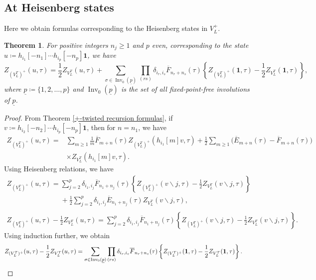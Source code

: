 \documentclass[pdftex]{sigma}
\numberwithin{equation}{section}
\newtheorem{Theorem}{Theorem}[section]
\theoremstyle{definition}
\begin{document}
\subsection{At Heisenberg states}

Here we obtain formulas corresponding to the Heisenberg states in $V_L^+$.

\begin{Theorem}\label{At Heisenberg states}
 For positive integers $n_j\geq 1$ and $p$ even, corresponding to the state
$u\coloneqq h_{i_1}[-n_1]\cdots h_{i_p}[-n_p]\mathbf{1}$,
 we have
 \[Z_{(V_L^T)^+}(u,\tau)=\frac{1}{2}Z_{V_L^T}(u,\tau)+\sum_{\sigma\in \operatorname{Inv}_0(\underline{p})}\prod_{(rs)}\delta_{i_r,i_s}\overline{F}_{n_r+n_s}(\tau)\left\{Z_{(V_L^T)^+}(\mathbf{1},\tau)-\frac{1}{2}Z_{V_L^T}(\mathbf{1},\tau)\right\},\]
 where $\underline{p}\coloneqq \{1,2,\dots, p\}$ and $\operatorname{Inv}_0(\underline{p})$ is the set of all fixed-point-free involutions of $\underline{p}$.
\end{Theorem}

\begin{proof}

From Theorem \ref{+-twisted recursion formulas}, if
$v\coloneqq h_{i_2}[-n_2]\cdots h_{i_p}[-n_p]\mathbf{1}$,
then for $n=n_1$, we have
\begin{align*}
Z_{(V_L^T)^+}(u,\tau)={}&\sum_{m\geq 1}\frac{1}{m}\overline{F}_{m+n}(\tau)Z_{(V_L^T)^+}(h_{i_1}[m]v,\tau)+\frac{1}{2}\sum_{m\geq 1}\bigl(\overline{E}_{m+n}(\tau)-\overline{F}_{m+n}(\tau)\bigr)\\
&\times Z_{V_L^T}(h_{i_1}[m]v, \tau).
\end{align*}
Using Heisenberg relations, we have
\begin{gather*}
Z_{(V_L^T)^+}(u,\tau)=\sum_{j=2}^p\delta_{i_1,i_j}\overline{F}_{n_1+n_j}(\tau)\left\{Z_{(V_L^T)^+}(v\backslash j,\tau)-\frac{1}{2}Z_{V_L^T}(v\backslash j,\tau)\right\}\\
\phantom{Z_{(V_L^T)^+}(u,\tau)=}{}+\frac{1}{2}\sum_{j=2}^p\delta_{i_1,i_j}\overline{E}_{n_1+n_j}(\tau)Z_{V_L^T}(v\backslash j,\tau),\\
Z_{(V_L^T)^+}(u,\tau)-\frac{1}{2}Z_{V_L^T}(u,\tau)=\sum_{j=2}^p\delta_{i_1,i_j}\overline{F}_{n_1+n_j}(\tau)\left\{Z_{(V_L^T)^+}(v\backslash j,\tau)-\frac{1}{2}Z_{V_L^T}(v\backslash j,\tau)\right\}.
\end{gather*}
Using induction further, we obtain
\[
Z_{(V_L^T)^+}(u,\tau)-\frac{1}{2}Z_{V_L^T}(u,\tau)=\sum_{\sigma\in {\rm Inv}_0(\underline{p})}\prod_{(rs)}\delta_{i_r,i_s}\overline{F}_{n_r+n_s}(\tau)
\left\{Z_{(V_L^T)^+}(\mathbf{1},\tau)-\frac{1}{2}Z_{V_L^T}(\mathbf{1},\tau)\right\}.\tag*{\qed}
\]\renewcommand{\qed}{}
\end{proof}
\end{document}
